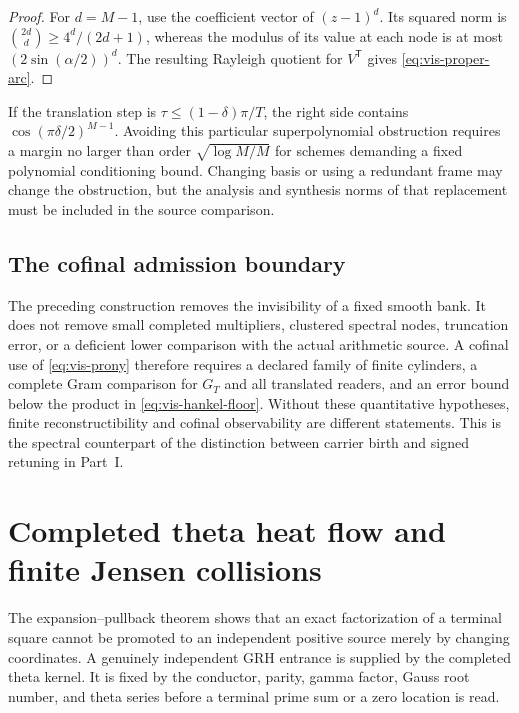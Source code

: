 \documentclass[11pt]{article}
\theoremstyle{definition}
\theoremstyle{remark}
\begin{document}
\begin{proof}
For $d=M-1$, use the coefficient vector of $(z-1)^d$.  Its squared norm
is $\binom{2d}{d}\ge4^d/(2d+1)$, whereas the modulus of its value at
each node is at most $(2\sin(\alpha/2))^d$.  The resulting Rayleigh
quotient for $V^{\mathsf T}$ gives \eqref{eq:vis-proper-arc}.
\end{proof}

If the translation step is $\tau\le(1-\delta)\pi/T$, the right side
contains $\cos(\pi\delta/2)^{M-1}$.  Avoiding this particular
superpolynomial obstruction requires a margin no larger than order
$\sqrt{\log M/M}$ for schemes demanding a fixed polynomial conditioning
bound.  Changing basis or using a redundant frame may change the
obstruction, but the analysis and synthesis norms of that replacement
must be included in the source comparison.

\subsection{The cofinal admission boundary}

The preceding construction removes the invisibility of a fixed smooth
bank.  It does not remove small completed multipliers, clustered spectral
nodes, truncation error, or a deficient lower comparison with the actual
arithmetic source.  A cofinal use of \eqref{eq:vis-prony} therefore requires
a declared family of finite cylinders, a complete Gram comparison for
$G_T$ and all translated readers, and an error bound below the product
in \eqref{eq:vis-hankel-floor}.  Without these quantitative hypotheses,
finite reconstructibility and cofinal observability are different
statements.  This is the spectral counterpart of the distinction between
carrier birth and signed retuning in Part~I.


\section{Completed theta heat flow and finite Jensen collisions}
\label{sec:grh-theta-heat}

The expansion--pullback theorem shows that an exact factorization of a
terminal square cannot be promoted to an independent positive source merely
by changing coordinates.  A genuinely independent GRH entrance is supplied
by the completed theta kernel.  It is fixed by the conductor, parity, gamma
factor, Gauss root number, and theta series before a terminal prime sum or a
zero location is read.
\end{document}
